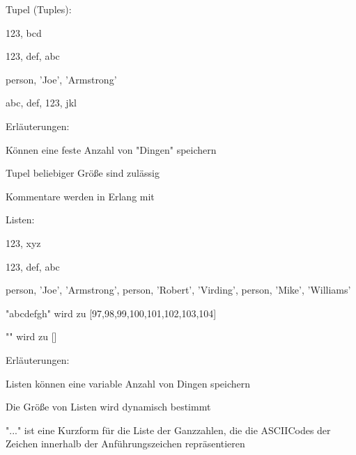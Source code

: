 \documentclass[10pt]{article}
\begin{document}
Tupel (Tuples):
\begin{itemize*}
  \item {123, bcd} %
  \item {123, def, abc}
  \item {person, 'Joe', 'Armstrong'}
  \item {abc, {def, 123}, jkl}
  \item {}
  \item Erläuterungen:
  \begin{itemize*}
    \item Können eine feste Anzahl von "Dingen" speichern
    \item Tupel beliebiger Größe sind zulässig
    \item Kommentare werden in Erlang mit %
  \end{itemize*}
\end{itemize*}

Listen:
\begin{itemize*}
  \item [123, xyz]
  \item [123, def, abc]
  \item [{person, 'Joe', 'Armstrong'}, {person, 'Robert', 'Virding'}, {person, 'Mike', 'Williams'}]
  \item "abcdefgh" wird zu [97,98,99,100,101,102,103,104]
  \item "" wird zu []
  \item Erläuterungen:
  \begin{itemize*}
    \item Listen können eine variable Anzahl von Dingen speichern
    \item Die Größe von Listen wird dynamisch bestimmt
    \item "..." ist eine Kurzform für die Liste der Ganzzahlen, die die ASCIICodes der Zeichen innerhalb der Anführungszeichen repräsentieren
  \end{itemize*}
\end{itemize*}
\end{document}
